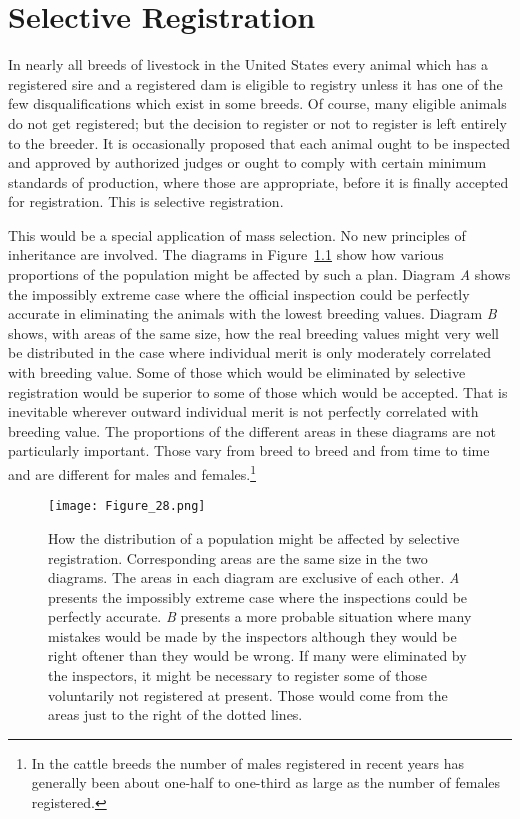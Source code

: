 \chapter{Selective Registration}
\label{cha:Lush_Chapter_16}

In nearly all breeds of livestock in the United States every animal
which has a registered sire and a registered dam is eligible to registry
unless it has one of the few disqualifications which exist in some breeds.
Of course, many eligible animals do not get registered; but the decision
to register or not to register is left entirely to the breeder. It is occasionally
proposed that each animal ought to be inspected and approved by
authorized judges or ought to comply with certain minimum standards
of production, where those are appropriate, before it is finally accepted
for registration. This is selective registration.

This would be a special application of mass selection. No new principles
of inheritance are involved. The diagrams in Figure~\ref{fig:Lush_Figure_28}
show how various proportions of the population might be affected by such a plan.
Diagram \textit{A} shows the impossibly extreme case where the official inspection
could be perfectly accurate in eliminating the animals with the
lowest breeding values. Diagram \textit{B} shows, with areas of the same size,
how the real breeding values might very well be distributed in the case
where individual merit is only moderately correlated with breeding
value. Some of those which would be eliminated by selective registration
would be superior to some of those which would be accepted. That
is inevitable wherever outward individual merit is not perfectly correlated
with breeding value. The proportions of the different areas in
these diagrams are not particularly important. Those vary from breed
to breed and from time to time and are different for males and
females.\footnote{In the cattle breeds the number of males registered in
recent years has generally been about one-half to one-third as large as
the number of females registered.}

\begin{figure}
	\centering
    \texttt{[image: Figure\_28.png]}
    \caption{How the distribution of a population might be affected by selective
			 registration. Corresponding areas are the same size in the two diagrams.
			 The areas in each diagram are exclusive of each other. \textit{A}
			 presents the impossibly extreme case where the inspections could be
			 perfectly accurate. \textit{B} presents a more probable situation
			 where many mistakes would be made by the inspectors although they would be
			 right oftener than they would be wrong. If many were eliminated by the inspectors,
			 it might be necessary to register some of those voluntarily not registered at present.
			 Those would come from the areas just to the right of the dotted lines.}
    \label{fig:Lush_Figure_28}
\end{figure}

